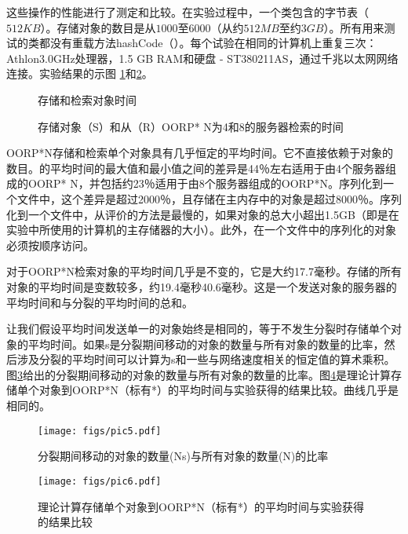 \documentclass[10pt,a4paper]{article}
\begin{document}
\begin{CJK*}{UTF8}{gkai}
这些操作的性能进行了测定和比较。在实验过程中，一个类包含的字节表（$512 KB$）。存储对象的数目是从$1000$至$6000$（从约$512MB$至约$3GB$）。所有用来测试的类都没有重载方法hashCode（）。每个试验在相同的计算机上重复三次：Athlon3.0GHz处理器，1.5 GB RAM和硬盘 - ST380211AS，通过千兆以太网网络连接。实验结果的示图 \ref{fig:subfig1}和\ref{fig:subfig2}。
\begin{figure}[!htbp]
	\centering
	\caption{存储和检索对象时间}
    	\label{fig:subfig1}
\end{figure}
\begin{figure}[!htbp]
	\centering
	\caption{存储对象（S）和从（R）OORP* N为4和8的服务器检索的时间}
    \label{fig:subfig2}
\end{figure}


OORP*N存储和检索单个对象具有几乎恒定的平均时间。它不直接依赖于对象的数目。的平均时间的最大值和最小值之间的差异是44％左右适用于由4个服务器组成的OORP* N，并包括约23％适用于由8个服务器组成的OORP*N。序列化到一个文件中，这个差异是超过2000％，且存储在主内存中的对象是超过8000％。序列化到一个文件中，从评价的方法是最慢的，如果对象的总大小超出1.5GB（即是在实验中所使用的计算机的主存储器的大小）。此外，在一个文件中的序列化的对象必须按顺序访问。


对于OORP*N检索对象的平均时间几乎是不变的，它是大约17.7毫秒。存储的所有对象的平均时间是变数较多，约19.4毫秒40.6毫秒。这是一个发送对象的服务器的平均时间和与分裂的平均时间的总和。


让我们假设平均时间发送单一的对象始终是相同的，等于不发生分裂时存储单个对象的平均时间。如果s是分裂期间移动的对象的数量与所有对象的数量的比率，然后涉及分裂的平均时间可以计算为s和一些与网络速度相关的恒定值的算术乘积。图\ref{fig:subfig3}给出的分裂期间移动的对象的数量与所有对象的数量的比率。图\ref{fig:subfig4}是理论计算存储单个对象到OORP*N（标有*）的平均时间与实验获得的结果比较。曲线几乎是相同的。
\begin{figure}[!htbp]
	\centering
	\caption{分裂期间移动的对象的数量(Ns)与所有对象的数量(N)的比率}
    	\texttt{[image: figs/pic5.pdf]}
    	\label{fig:subfig3}
\end{figure}
\begin{figure}[!htbp]
	\centering
	\caption{理论计算存储单个对象到OORP*N（标有*）的平均时间与实验获得的结果比较}
    	\texttt{[image: figs/pic6.pdf]}
    \label{fig:subfig4}
\end{figure}


\end{CJK*}
\end{document}
